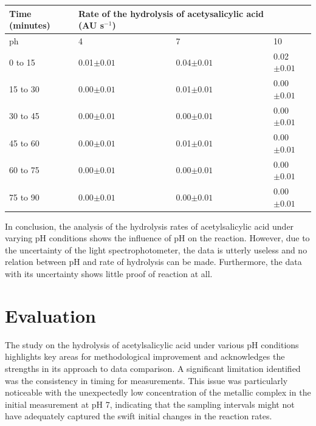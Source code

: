\documentclass{article}
\begin{document}
\begin{table}[H]
    \centering
    \begin{tabular}{|l|l|l|l|}
    \hline
        Time (minutes) & \multicolumn{2}{l}{Rate of the hydrolysis of acetysalicylic acid (AU s$^{-1}$)}& \\ \hline
        ph & 4\enspace\enspace\enspace\enspace\enspace\enspace\enspace\enspace\enspace\enspace\enspace\enspace\enspace\enspace\enspace\enspace & 7 & 10\enspace\enspace\enspace\enspace\enspace\enspace\enspace\enspace\enspace\enspace\enspace\enspace\enspace\enspace\enspace\enspace \\ \hline
        0 to 15 & 0.01$\pm0.01$ & 0.04$\pm0.01$ & 0.02$\pm0.01$ \\ \hline
        15 to 30 & 0.00$\pm0.01$ & 0.01$\pm0.01$ & 0.00$\pm0.01$ \\ \hline
        30 to 45 & 0.00$\pm0.01$ & 0.00$\pm0.01$ & 0.00$\pm0.01$ \\ \hline
        45 to 60 & 0.00$\pm0.01$ & 0.01$\pm0.01$ & 0.00$\pm0.01$ \\ \hline
        60 to 75 & 0.00$\pm0.01$ & 0.00$\pm0.01$ & 0.00$\pm0.01$ \\ \hline
        75 to 90 & 0.00$\pm0.01$ & 0.00$\pm0.01$ & 0.00$\pm0.01$ \\ \hline
    \end{tabular}
\end{table}

In conclusion, the analysis of the hydrolysis rates of acetylsalicylic acid under varying pH conditions shows the influence of pH on the reaction. However, due to the uncertainty of the light spectrophotometer, the data is utterly useless and no relation between pH and rate of hydrolysis can be made. Furthermore, the data with its uncertainty shows little proof of reaction at all.

\section{Evaluation}
The study on the hydrolysis of acetylsalicylic acid under various pH conditions highlights key areas for methodological improvement and acknowledges the strengths in its approach to data comparison. A significant limitation identified was the consistency in timing for measurements. This issue was particularly noticeable with the unexpectedly low concentration of the metallic complex in the initial measurement at pH 7, indicating that the sampling intervals might not have adequately captured the swift initial changes in the reaction rates.
\end{document}
